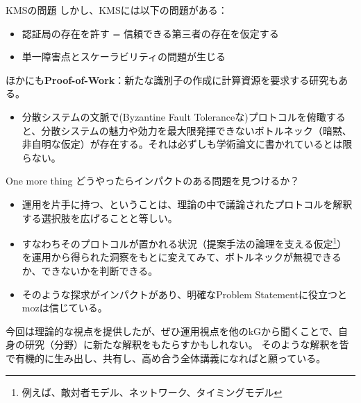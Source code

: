\documentclass[aspectratio=169,10pt]{beamer}
\newenvironment{outlineblock}[1][]
{\begin{tcolorbox}[colframe=black, colback=white, boxrule=1pt, boxsep=5pt]}
{\end{tcolorbox}}
\begin{document}
\begin{frame}{KMSの問題}
しかし、KMSには以下の問題がある：
\begin{itemize}
    \item 認証局の存在を許す = 信頼できる第三者の存在を仮定する
    \item 単一障害点とスケーラビリティの問題が生じる
\end{itemize}
ほかにも\textbf{Proof-of-Work}：新たな識別子の作成に計算資源を要求する研究もある。

\begin{outlineblock}
    \begin{itemize}
        \item 分散システムの文脈で(Byzantine Fault Toleranceな)プロトコルを俯瞰すると、分散システムの魅力や効力を最大限発揮できないボトルネック（暗黙、非自明な仮定）が存在する。それは必ずしも学術論文に書かれているとは限らない。
    \end{itemize}
\end{outlineblock}

\end{frame}


\begin{frame}{One more thing}
どうやったらインパクトのある問題を見つけるか？
\begin{outlineblock}
    \begin{itemize}
        \item 運用を片手に持つ、ということは、理論の中で議論されたプロトコルを解釈する選択肢を広げることと等しい。
        \item すなわちそのプロトコルが置かれる状況（提案手法の論理を支える仮定\footnote{例えば、敵対者モデル、ネットワーク、タイミングモデル}）を運用から得られた洞察をもとに変えてみて、ボトルネックが無視できるか、できないかを判断できる。
        \item そのような探求がインパクトがあり、明確なProblem Statementに役立つとmozは信じている。
    \end{itemize}
\end{outlineblock}
今回は理論的な視点を提供したが、ぜひ運用視点を他のkGから聞くことで、自身の研究（分野）に新たな解釈をもたらすかもしれない。
そのような解釈を皆で有機的に生み出し、共有し、高め合う全体講義になればと願っている。
\end{frame}

\end{document}
